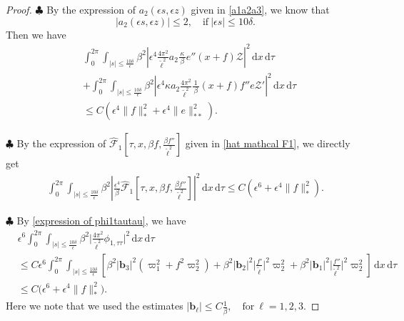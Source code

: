 \documentclass[10pt, reqno]{amsart}
\numberwithin{equation}{section}
\theoremstyle{definition}
\begin{document}
{{\begin{proof}
\smallskip\noindent$\clubsuit$
By the expression of $a_2(\epsilon s, \epsilon z)$ given in \eqref{a1a2a3}, we know that
\[|a_2(\epsilon s, \epsilon z)| \le 2, \quad \text{if}~|\epsilon s| \le 10\delta. \]
Then we have
\begin{align} \label{estimate in mathcal S-L2-3-1}
& \int_0^{2\pi} \int_{|s| \le \frac{10\delta} \epsilon}
\beta^2\left|\epsilon^4 \frac{4\pi^2} {{\tilde\ell}^2} a_2\frac{\kappa}{\, \beta\, } e'' (x+f)\mathcal Z \right|^2 \,{\mathrm d}x \,{\mathrm d}\tau
\nonumber\\[2mm]
&+ \int_0^{2\pi} \int_{|s| \le \frac{10\delta} \epsilon} \beta^2\left|\epsilon^4 \kappa a_2 \frac{ 4\pi^2} {{\tilde\ell}^2} \frac{1}{\, \beta\, } (x+f) f'' e \mathcal Z'\right|^2 \,{\mathrm d}x \,{\mathrm d}\tau
\nonumber\\[2mm]
& \le C \left(\epsilon^4 \|f\|_*^2+ \epsilon^4\|e\|_{**}^2 \right).
\end{align}

\smallskip\noindent$\clubsuit$
By the expression of $\hat{\mathcal F}_1\left[\tau, x, \beta f, \frac{\beta f''}{\tilde\ell^2} \right]$ given in \eqref{hat mathcal F1}, we directly get
\begin{align} \label{estimate in mathcal S-L2-4}
 \int_0^{2\pi} \int_{|s| \le \frac{10\delta} \epsilon} \beta^2\left| \frac{\epsilon^4}{\beta} \hat{\mathcal F}_1\left[\tau, x, \beta f, \frac{\beta f''}{\tilde\ell^2} \right] \right|^2\,{\mathrm d}x \,{\mathrm d}\tau \le
 C \left(\epsilon^6+ \epsilon^4 \|f\|_*^2\right).
\end{align}

\smallskip\noindent$\clubsuit$
By \eqref{expression of phi1tautau}, we have
\begin{align} \label{estimate in mathcal S-L2-5}
 & \epsilon^6\int_0^{2\pi} \int_{|s| \le \frac{10\delta} \epsilon}
 \beta^2 \Big|\frac{4\pi^2}{{\tilde\ell}^2} {\phi}_{1, \tau\tau} \Big|^2 \,{\mathrm d}x \,{\mathrm d}\tau
\nonumber\\[2mm]
& \le C \epsilon^6\int_0^{2\pi} \int_{|s| \le \frac{10\delta} \epsilon} \left[ \beta^2 |{\mathbf b}_3|^2\left( \varpi_{1}^2 + f^2\varpi_2^2\right)
+ \beta^2 |{\mathbf b}_2|^2\Big|\frac{f'} {\tilde\ell}\Big|^2\varpi_2^2
+ \beta^2 |{\mathbf b}_1|^2\Big|\frac{f''} {\tilde\ell^2}\Big|^2\varpi_2^2 \right]\,{\mathrm d}x \,{\mathrm d}\tau
\nonumber\\[2mm]
& \le C \big(\epsilon^6+ \epsilon^4 \|f\|_*^2\big).
\end{align}
 Here we note that we used the estimates
$
 |{\mathbf b}_\ell| \le C \frac1{\beta}, \quad \text{for}~\ell= 1, 2, 3.
$


\end{proof}}}
\end{document}
